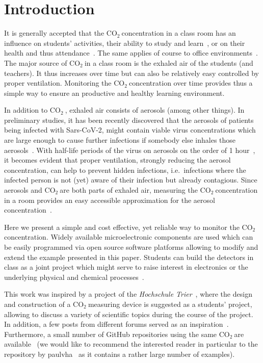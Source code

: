 \documentclass[12pt,a4paper]{article}
\newcommand{\coo}{\ensuremath{\mathrm{CO_2}~}}
\begin{document}
\section{Introduction}\label{s:intro}
It is generally accepted that the \coo concentration in a class room has an influence on students' activities, their ability to study and learn~\cite{TWARDELLA2012,GAIHRE2014}, or on their health and thus attendance~\cite{SHENDELL2004}. The same applies of course to office environments~\cite{ALLEN2016}. The major source of \coo in a class room is the exhaled air of the students (and teachers). It thus increases over time but can also be relatively easy controlled by proper ventilation. Monitoring the \coo concentration over time provides thus a simple way to ensure an productive and healthy learning environment. 

In addition to \coo, exhaled air consists of aerosols (among other things). In preliminary studies, it has been recently discovered that the aerosols of patients being infected with Sars-CoV-2, might contain viable virus concentrations which are large enough to cause further infections if somebody else inhales those aerosols~\cite{LEDNICKY2020,MORAWSKA2020,KOHANSKI2020}. With half-life periods of the virus on aerosols on the order of 1 hour~\cite{DOREMALEN2020}, it becomes evident that proper ventilation, strongly reducing the aerosol concentration, can help to prevent hidden infections, i.e.\ infections where the infected person is not (yet) aware of their infection but already contagious. Since aerosols and \coo are both parts of exhaled air, measuring the \coo concentration in a room provides an easy accessible approximation for the aerosol concentration~\cite{HARTMANN2020}.

Here we present a simple and cost effective, yet reliable way to monitor the \coo concentration. Widely available microelectronic components are used which can be easily programmed via open source software platforms allowing to modify and extend the example presented in this paper. Students can build the detectors in class as a joint project which might serve to raise interest in electronics or the underlying physical and chemical processes~\cite{WATZKA2011}. 

This work was inspired by a project of the \textit{Hochschule Trier}~\cite{BIRKENFELD2020}, where the design and construction of a \coo measuring device is suggested as a students' project, allowing to discuss a variety of scientific topics during the course of the project. In addition, a few posts from different forums served as an inspiration~\cite{BOYLES2020,METROPOL2020,OMBRA2020,ZENTRIS2020}. Furthermore, a small number of GitHub repositories using the same \coo are available~\cite{MKETZ2020,NETZBASTELN2020,PAULVHA2020} (we would like to recommend the interested reader in particular to the repository by paulvha~\cite{PAULVHA2020} as it contains a rather large number of examples).
\end{document}
